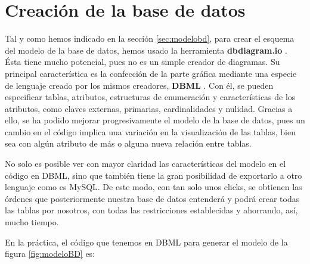 \section{Creación de la base de datos}

Tal y como hemos indicado en la sección \ref{sec:modelobd}, para crear el esquema del modelo de la base de datos, hemos usado la herramienta \textbf{dbdiagram.io} \cite{dbdiagram}. Ésta tiene mucho potencial, pues no es un simple creador de diagramas. Su principal característica es la confección de la parte gráfica mediante una especie de lenguaje creado por los mismos creadores, \textbf{DBML} \cite{dbml}. Con él, se pueden especificar tablas, atributos, estructuras de enumeración y características de los atributos, como claves externas, primarias, cardinalidades y nulidad. Gracias a ello, se ha podido mejorar progresivamente el modelo de la base de datos, pues un cambio en el código implica una variación en la visualización de las tablas, bien sea con algún atributo de más o alguna nueva relación entre tablas.

No solo es posible ver con mayor claridad las características del modelo en el código en DBML, sino que también tiene la gran posibilidad de exportarlo a otro lenguaje como es MySQL. De este modo, con tan solo unos clicks, se obtienen las órdenes que posteriormente nuestra base de datos entenderá y podrá crear todas las tablas por nosotros, con todas las restricciones establecidas y ahorrando, así, mucho tiempo.

En la práctica, el código que tenemos en DBML para generar el modelo de la figura \ref{fig:modeloBD} es:

